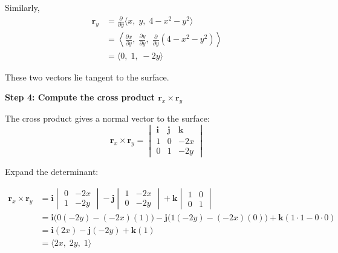 \begin{examplebox}
    Similarly,
    \begin{align*}
        \mathbf{r}_y
         & = \frac{\partial}{\partial y}\langle x,\; y,\; 4-x^2-y^2\rangle                                                                       \\
         & = \left\langle \frac{\partial x}{\partial y},\; \frac{\partial y}{\partial y},\; \frac{\partial}{\partial y}(4-x^2-y^2) \right\rangle \\
         & = \langle 0,\; 1,\; -2y \rangle
    \end{align*}

    These two vectors lie tangent to the surface.

    \textbf{Step 4: Compute the cross product $\mathbf{r}_x \times \mathbf{r}_y$}

    The cross product gives a normal vector to the surface:
    \begin{equation*}
        \mathbf{r}_x \times \mathbf{r}_y =
        \begin{vmatrix}
            \mathbf{i} & \mathbf{j} & \mathbf{k} \\
            1          & 0          & -2x        \\
            0          & 1          & -2y
        \end{vmatrix}
    \end{equation*}

    Expand the determinant:

    \begin{align*}
        \mathbf{r}_x \times \mathbf{r}_y
         & =
        \mathbf{i}
        \begin{vmatrix}
            0 & -2x \\
            1 & -2y
        \end{vmatrix}
        -
        \mathbf{j}
        \begin{vmatrix}
            1 & -2x \\
            0 & -2y
        \end{vmatrix}
        +
        \mathbf{k}
        \begin{vmatrix}
            1 & 0 \\
            0 & 1
        \end{vmatrix}                               \\
         & =
        \mathbf{i}\bigl(0(-2y)-(-2x)(1)\bigr)
        -
        \mathbf{j}\bigl(1(-2y)-(-2x)(0)\bigr)
        +
        \mathbf{k}(1\cdot 1-0\cdot 0)                \\
         & =
        \mathbf{i}(2x)-\mathbf{j}(-2y)+\mathbf{k}(1) \\
         & =
        \langle 2x,\; 2y,\; 1\rangle
    \end{align*}


\end{examplebox}
